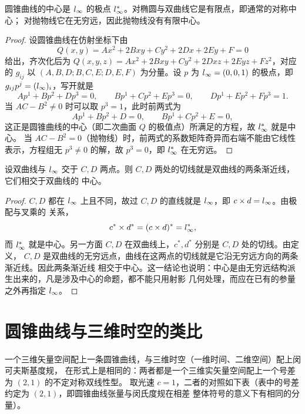 \begin{proposition}[中心]
圆锥曲线的中心是 $l_{\infty}$ 的极点 $l_{\infty}^*$。对椭圆与双曲线它是有限点，即通常的对称中心；
对抛物线它在无穷远，因此抛物线没有有限中心。
\end{proposition}

\begin{proof}
设圆锥曲线在仿射坐标下由
\[
Q(x,y)=Ax^2+2Bxy+Cy^2+2Dx+2Ey+F=0
\]
给出，齐次化后为 $Q(x,y,z)=Ax^2+2Bxy+Cy^2+2Dxz+2Eyz+Fz^2$，对应的 $g_{ij}$ 以
$(A,B,D;B,C,E;D,E,F)$ 为分量。设 $p$ 为 $l_{\infty}=(0,0,1)$ 的极点，即
$g_{ij}p^j=(l_{\infty})_i$，写开就是
\[
Ap^1+Bp^2+Dp^3=0,\qquad Bp^1+Cp^2+Ep^3=0,\qquad Dp^1+Ep^2+Fp^3=1 .
\]
当 $AC-B^2\neq0$ 时可以取 $p^3=1$，此时前两式为
\[
Ap^1+Bp^2+D=0,\qquad Bp^1+Cp^2+E=0,
\]
这正是圆锥曲线的中心（即二次曲面 $Q$ 的极值点）所满足的方程，故 $l_{\infty}^*$ 就是中心。
当 $AC-B^2=0$（抛物线）时，前两式的系数矩阵奇异而右端不能由它线性表示，方程组无 $p^3\neq0$
的解，故 $p^3=0$，即 $l_{\infty}^*$ 在无穷远。
\end{proof}

\begin{proposition}[渐近线与中心]
设双曲线与 $l_{\infty}$ 交于 $C,D$ 两点。则 $C,D$ 两处的切线就是双曲线的两条渐近线，它们相交于双曲线的
中心。
\end{proposition}

\begin{proof}
$C,D$ 都在 $l_{\infty}$ 上且不同，故过 $C,D$ 的直线就是 $l_{\infty}$，即 $c\times d=l_{\infty}$。由极配与叉乘的
关系，
\[
c^*\times d^*=(c\times d)^*=l_{\infty}^*,
\]
而 $l_{\infty}^*$ 就是中心。另一方面 $C,D$ 在双曲线上，$c^*,d^*$ 分别是 $C,D$ 处的切线。由定义，
$C,D$ 是双曲线的无穷远点，曲线在这两点的切线就是它沿无穷远方向的两条渐近线。因此两条渐近线
相交于中心。这一结论也说明：中心是由无穷远结构派生出来的，凡是涉及中心的命题，都不能只用射影
几何处理，而应在已有的参量之外再指定 $l_{\infty}$。
\end{proof}

\section{圆锥曲线与三维时空的类比}

一个三维矢量空间配上一条圆锥曲线，与三维时空（一维时间、二维空间）配上闵可夫斯基度规，
在形式上是相同的：两者都是一个三维实矢量空间配上一个号差为 $(2,1)$ 的不定对称双线性型。
取光速 $c=1$，二者的对照如下表（表中的号差约定为 $(2,1)$，即圆锥曲线张量与闵氏度规在相差
整体符号的意义下有相同的分量）。

